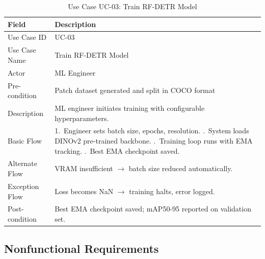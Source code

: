 \begin{table}[H]
\centering
\caption{Use Case UC-03: Train RF-DETR Model}
\begin{tabular}{p{3.5cm} p{9cm}}
\toprule
\rowcolor{tableHeader}\tableheadfont Field & \tableheadfont Description \\
\midrule
Use Case ID       & UC-03 \\
\rowcolor{tableRowAlt}Use Case Name     & Train RF-DETR Model \\
Actor             & ML Engineer \\
\rowcolor{tableRowAlt}Pre-condition     & Patch dataset generated and split in COCO format \\
Description       & ML engineer initiates training with configurable hyperparameters. \\
\rowcolor{tableRowAlt}Basic Flow        & 1.\ Engineer sets batch size, epochs, resolution. \newline 2.\ System loads DINOv2 pre-trained backbone. \newline 3.\ Training loop runs with EMA tracking. \newline 4.\ Best EMA checkpoint saved. \\
Alternate Flow    & VRAM insufficient $\to$ batch size reduced automatically. \\
\rowcolor{tableRowAlt}Exception Flow    & Loss becomes NaN $\to$ training halts, error logged. \\
Post-condition    & Best EMA checkpoint saved; mAP50-95 reported on validation set. \\
\bottomrule
\end{tabular}
\end{table}

\subsection{Nonfunctional Requirements}

